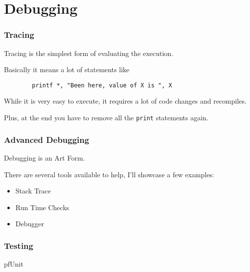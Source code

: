 \section{Debugging}

\begin{frame}[fragile]
    \frametitle{Tracing}
    Tracing is the simplest form of evaluating the execution.

    Basically it means a lot of statements like

    \begin{lstlisting}
        printf *, "Been here, value of X is ", X
    \end{lstlisting}

    While it is very easy to execute, it requires a lot of code changes and recompiles.

    Plus, at the end you have to remove all the \texttt{print} statements again.
\end{frame}

\begin{frame}
    \frametitle{Advanced Debugging}
    Debugging is an Art Form.

    There are several tools available to help, I'll showcase a few examples:

    \begin{itemize}
        \item Stack Trace
        \item Run Time Checks
        \item Debugger
    \end{itemize}

\end{frame}

\begin{frame}
    \frametitle{Testing}
    pfUnit 
\end{frame}

